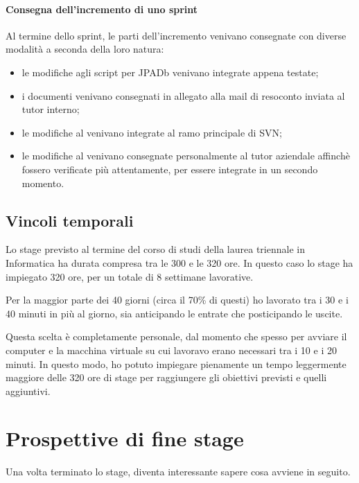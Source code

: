 \paragraph{Consegna dell'incremento di uno sprint} \mbox{}

Al termine dello sprint, le parti dell'incremento venivano consegnate con 
diverse modalità a seconda della loro natura:

\begin{itemize}
\item le modifiche agli script per JPADb venivano integrate appena testate;
\item i documenti venivano consegnati in allegato alla mail di resoconto
  inviata al tutor interno;
\item le modifiche al \BKEND{} venivano integrate al ramo principale di SVN;
\item le modifiche al \FREND{} venivano consegnate personalmente al tutor
  aziendale affinchè fossero verificate più attentamente, per essere integrate
  in un secondo momento.
\end{itemize}

\subsection{Vincoli temporali}

Lo stage previsto al termine del corso di studi della laurea triennale in
Informatica ha durata compresa tra le 300 e le 320 ore. In questo caso lo
stage ha impiegato 320 ore, per un totale di 8 settimane lavorative.

Per la maggior parte dei 40 giorni (circa il 70\% di questi) ho lavorato tra i
30 e i 40 minuti in più al giorno, sia anticipando le entrate che posticipando
le uscite.

Questa scelta è completamente personale, dal momento che spesso per avviare il
computer e la macchina virtuale su cui lavoravo erano necessari tra i 10 e i
20 minuti. In questo modo, ho potuto impiegare pienamente un tempo leggermente
maggiore delle 320 ore di stage per raggiungere gli obiettivi previsti e
quelli aggiuntivi.

\section{Prospettive di fine stage}

Una volta terminato lo stage, diventa interessante sapere cosa avviene in
seguito.


